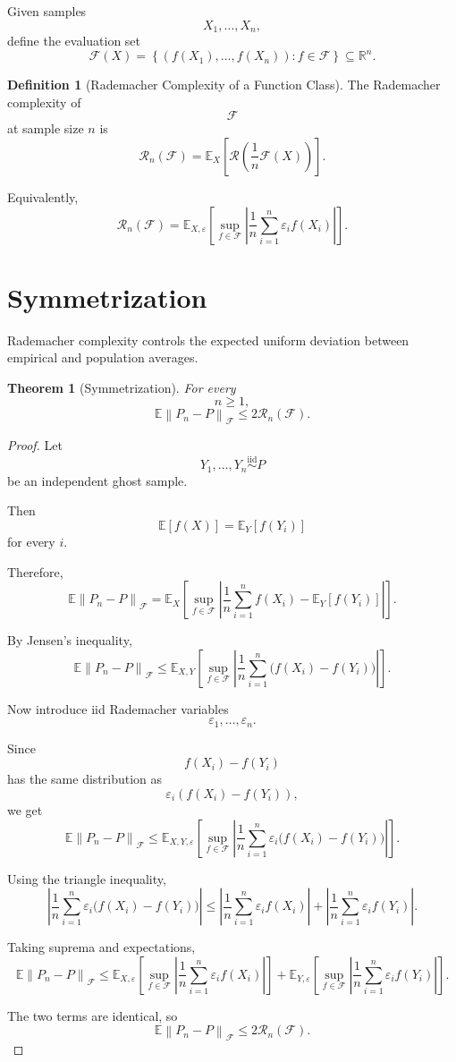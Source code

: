 \documentclass[12pt,oneside]{book}
\numberwithin{equation}{section}
\theoremstyle{definition}
\newtheorem{definition}{Definition}[section]
\theoremstyle{plain}
\newtheorem{theorem}{Theorem}[section]
\theoremstyle{remark}
\newcommand{\R}{\mathbb{R}}
\newcommand{\E}{\mathbb{E}}
\newcommand{\iid}{\overset{\text{iid}}{\sim}}
\newcommand{\norm}[1]{\left\lVert #1 \right\rVert}
\begin{document}
Given samples
\[
X_1,\dots,X_n,
\]
define the evaluation set
\[
\mathcal{F}(X)
=
\left\{
(f(X_1),\dots,f(X_n)):f\in\mathcal{F}
\right\}
\subseteq\R^n.
\]

\begin{definition}[Rademacher Complexity of a Function Class]
The Rademacher complexity of
\[
\mathcal{F}
\]
at sample size $n$ is
\[
\mathcal{R}_n(\mathcal{F})
=
\E_X
\left[
\mathcal{R}
\left(
\frac{1}{n}\mathcal{F}(X)
\right)
\right].
\]

Equivalently,
\[
\mathcal{R}_n(\mathcal{F})
=
\E_{X,\varepsilon}
\left[
\sup_{f\in\mathcal{F}}
\left|
\frac{1}{n}
\sum_{i=1}^n
\varepsilon_i f(X_i)
\right|
\right].
\]
\end{definition}

\section{Symmetrization}

Rademacher complexity controls the expected uniform deviation between empirical and population averages.

\begin{theorem}[Symmetrization]
For every
\[
n\geq1,
\]
\[
\E\norm{P_n-P}_{\mathcal{F}}
\leq
2\mathcal{R}_n(\mathcal{F}).
\]
\end{theorem}

\begin{proof}
Let
\[
Y_1,\dots,Y_n\iid P
\]
be an independent ghost sample.

Then
\[
\E[f(X)]
=
\E_Y[f(Y_i)]
\]
for every $i$.

Therefore,
\[
\E\norm{P_n-P}_{\mathcal{F}}
=
\E_X
\left[
\sup_{f\in\mathcal{F}}
\left|
\frac{1}{n}\sum_{i=1}^n f(X_i)
-
\E_Y[f(Y_i)]
\right|
\right].
\]

By Jensen's inequality,
\[
\E\norm{P_n-P}_{\mathcal{F}}
\leq
\E_{X,Y}
\left[
\sup_{f\in\mathcal{F}}
\left|
\frac{1}{n}\sum_{i=1}^n
\bigl(f(X_i)-f(Y_i)\bigr)
\right|
\right].
\]

Now introduce iid Rademacher variables
\[
\varepsilon_1,\dots,\varepsilon_n.
\]

Since
\[
f(X_i)-f(Y_i)
\]
has the same distribution as
\[
\varepsilon_i(f(X_i)-f(Y_i)),
\]
we get
\[
\E\norm{P_n-P}_{\mathcal{F}}
\leq
\E_{X,Y,\varepsilon}
\left[
\sup_{f\in\mathcal{F}}
\left|
\frac{1}{n}\sum_{i=1}^n
\varepsilon_i
\bigl(f(X_i)-f(Y_i)\bigr)
\right|
\right].
\]

Using the triangle inequality,
\[
\left|
\frac{1}{n}\sum_{i=1}^n
\varepsilon_i
\bigl(f(X_i)-f(Y_i)\bigr)
\right|
\leq
\left|
\frac{1}{n}\sum_{i=1}^n
\varepsilon_i f(X_i)
\right|
+
\left|
\frac{1}{n}\sum_{i=1}^n
\varepsilon_i f(Y_i)
\right|.
\]

Taking suprema and expectations,
\[
\E\norm{P_n-P}_{\mathcal{F}}
\leq
\E_{X,\varepsilon}
\left[
\sup_{f\in\mathcal{F}}
\left|
\frac{1}{n}\sum_{i=1}^n
\varepsilon_i f(X_i)
\right|
\right]
+
\E_{Y,\varepsilon}
\left[
\sup_{f\in\mathcal{F}}
\left|
\frac{1}{n}\sum_{i=1}^n
\varepsilon_i f(Y_i)
\right|
\right].
\]

The two terms are identical, so
\[
\E\norm{P_n-P}_{\mathcal{F}}
\leq
2\mathcal{R}_n(\mathcal{F}).
\]
\end{proof}
\end{document}
